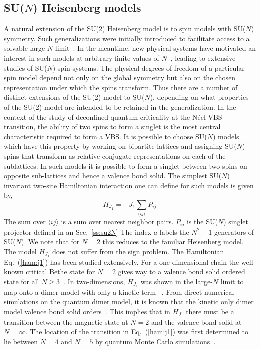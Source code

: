 \documentclass[range]{ar2e}
\begin{document}
\subsection{SU($N$) Heisenberg models}
\label{ss:j1N}
A natural extension of the SU(2) Heisenberg model is to spin models with
SU($N$) symmetry. Such generalizations were initially introduced to
facilitate access to
a solvable large-$N$ limit~\cite{affleck1985:lgN,Read89}. In the meantime, new physical systems have
motivated an interest in such models at arbitrary finite values of
$N$~\cite{gorshkov2010:sun,kugel1982:kk}, leading to extensive studies of SU($N$) spin systems. The physical degrees of freedom of a particular
spin model depend not only on the global symmetry but also on the
chosen representation under which the spins transform. Thus there are
a number of distinct extensions of the SU(2) model to SU($N$), depending on
what properties of the SU(2) model are intended to be retained in the
generalization. In the context of the study of deconfined quantum criticality at the
N\'eel-VBS transition, the ability of two spins to form a singlet is the most
central characteristic required to form a VBS. It
is possible to choose SU($N$) models which have this property by
working on bipartite lattices and
assigning SU($N$) spins that transform
as relative conjugate representations
 on each of the sublattices. In such models it is possible to form a singlet
between two spins on opposite sub-lattices and hence a valence bond
solid.  The simplest SU($N$) invariant two-site Hamiltonian interaction one can define for
such models is given by,
\begin{equation}
\label{ham:j1}
H_{J_1} = -J_1 \sum_{\langle ij\rangle} P_{ij}
\end{equation}
The sum over $\langle ij \rangle$ is a sum over nearest neighbor
pairs. $P_{ij}$ is the SU($N$) singlet projector defined in an Sec.~\ref{ss:su2N} The index $a$ labels the $N^2-1$ generators of
SU($N$). We note that for $N=2$ this reduces to the familiar
Heisenberg model. The model $H_{J_1}$ does not suffer from the sign
problem. The Hamiltonian Eq.~(\ref{ham:j1}) has been studied extensively. For a 
one-dimensional chain the well known critical Bethe state for $N=2$ gives way to a valence bond solid
ordered state for all $N\geq 3$~\cite{barber1989:d1n3_vbs,klumper1989:d1n3_vbs,affleck1985:lgN}.   In two-dimensions, $H_{J_1}$ was shown in the large-$N$ limit to map onto a dimer model
with only a kinetic term
~\cite{read1989:nucphysB}. From direct numerical simulations
on the quantum dimer model, it is known that the kinetic only dimer model
valence bond solid orders~\cite{sachdev1989:qd_vbs}.  This implies that in $H_{J_1}$ there must be a transition
between the magnetic state at $N=2$ and the valence bond solid at
$N=\infty$.  The location of the transition in Eq.~(\ref{ham:j1}) was first
determined to lie between $N=4$ and $N=5$ by quantum Monte Carlo
simulations~\cite{harada2003:sun}.
\end{document}
